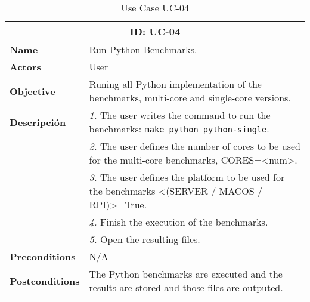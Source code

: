 \begin{table}[H]
    \centering
    \begin{tabular}{l p{10cm}}
        \toprule
        \multicolumn{2}{c}{\textbf{ID: UC-04}} \\
        \toprule
        \textbf{Name}                         &  Run Python Benchmarks. \\
        \textbf{Actors}                       &  User \\
        \textbf{Objective}                    &  Runing all Python implementation of the benchmarks, multi-core and single-core versions. \\
        \multirow{1}{*}{\textbf{Descripción}} & \textsl{1.} The user writes the command to run the benchmarks: \texttt{make python python-single}.\\
                                              & \textsl{2.} The user defines the number of cores to be used for the multi-core benchmarks, CORES=<num>.\\
                                              & \textsl{3.} The user defines the platform to be used for the benchmarks <(SERVER / MACOS / RPI)>=True.\\
                                              & \textsl{4.} Finish the execution of the benchmarks.\\
                                              & \textsl{5.} Open the resulting files.\\ 
        \textbf{Preconditions}                &  N/A \\
        \textbf{Postconditions}               &  The Python benchmarks are executed and the results are stored and those files are outputed. \\
    \end{tabular}
    \caption{Use Case UC-04}
    \label{tab:uc-04}
\end{table}


